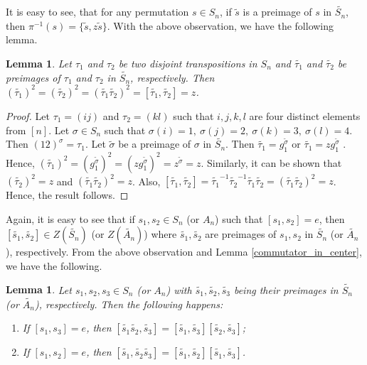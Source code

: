 \documentclass[12pt,a4paper]{article}
\newtheorem{lemma}[theorem]{Lemma}
\begin{document}
It is easy to see, that for any permutation $s\in S_n$, if $\tilde{s}$ is a preimage of $s$ in $\tilde{S_n}$, then $\pi^{-1}(s)=\{\tilde{s},z\tilde{s}\}$. With the above observation, we have the following lemma.
\begin{lemma}\label{preimage_transposition}
Let $\tau_1$ and $\tau_2$ be two disjoint transpositions in $S_n$ and $\tilde{\tau_1}$ and $\tilde{\tau_2}$ be preimages of $\tau_1$ and $\tau_2$ in $\tilde{S_n}$, respectively. Then $(\tilde{\tau_1})^2=(\tilde{\tau_2})^2=(\tilde{\tau_1}\tilde{\tau_2})^2=[\tilde{\tau_1},\tilde{\tau_2}]=z$.     
\end{lemma}
\begin{proof}
Let $\tau_1=(ij)$ and $\tau_2=(kl)$ such that $i,j,k,l$ are four distinct elements from $[n]$. Let $\sigma\in S_n$ such that $\sigma(i)=1,~\sigma(j)=2,~\sigma(k)=3,~\sigma(l)=4$. Then $(12)^{\sigma}=\tau_1$. Let $\tilde{\sigma}$ be a preimage of $\sigma$ in $\tilde{S_n}$. Then $\tilde{\tau_1}=g_1^{\tilde{\sigma}}$ or $\tilde{\tau_1}=zg_1^{\tilde{\sigma}}$ . Hence, $(\tilde{\tau_1})^2=(g_1^{\tilde{\sigma}})^2=(zg_1^{\tilde{\sigma}})^2=z^{\tilde{\sigma}}=z.$ Similarly, it can be shown that $(\tilde{\tau_2})^2=z$ and $(\tilde{\tau_1}\tilde{\tau_2})^2=z$. Also, $[\tilde{\tau_1},\tilde{\tau_2}]=\tilde{\tau_1}^{-1}\tilde{\tau_2}^{-1}\tilde{\tau_1}\tilde{\tau_2}=(\tilde{\tau_1}\tilde{\tau_2})^2=z$. Hence, the result follows.
\end{proof}
Again, it is easy to see that if $s_1,s_2\in S_n$ (or $A_n$) such that $[s_1,s_2]=e$, then $[\tilde{s_1},\tilde{s_2}]\in Z(\tilde{S_n})$ (or $Z(\tilde{A_n})$) where $\tilde{s_1},\tilde{s_2}$ are preimages of $s_1,s_2$ in $\tilde{S_n}$ (or $\tilde{A_n}$), respectively. From the above observation and Lemma \ref{commutator_in_center}, we have the following.

\begin{lemma}\label{disjoint_commutators}
Let $s_1,s_2,s_3\in S_n$ (or $A_n$) with $\tilde{s_1},\tilde{s_2},\tilde{s_3}$ being their preimages in $\tilde{S_n}$ (or $\tilde{A_n}$), respectively. Then the following happens:
\begin{enumerate}[\rm (i)]
\item If $[s_1,s_3]=e$, then $[\tilde{s_1}\tilde{s_2},\tilde{s_3}]=[\tilde{s_1},\tilde{s_3}][\tilde{s_2},\tilde{s_3}]$;
\item If $[s_1,s_2]=e$, then $[\tilde{s_1},\tilde{s_2}\tilde{s_3}]=[\tilde{s_1},\tilde{s_2}][\tilde{s_1},\tilde{s_3}]$.
\end{enumerate}    
\end{lemma}
\end{document}
